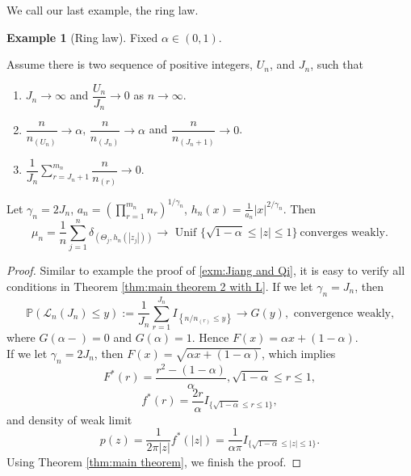 \documentclass[12pt]{article}
\theoremstyle{plain}
\theoremstyle{definition}
\newtheorem{exm}{\textbf{Example}}
\theoremstyle{remark}
\begin{document}
We call our last example, the ring law.
\begin{exm}[Ring law]
    Fixed $\alpha\in (0,1)$.
    
    Assume there is two sequence of positive integers, $U_n$, and $J_n$, such that
    \begin{enumerate}
        \item $J_n\rightarrow \infty$ and $\dfrac{U_n}{J_n}\rightarrow 0$ as $n\rightarrow \infty$.
        \item $\dfrac{n}{n_{(U_n)}}\rightarrow \alpha$, $\dfrac{n}{n_{(J_n)}}\rightarrow \alpha$ and $\dfrac{n}{n_{(J_n+1)}}\rightarrow 0$.
        \item $\dfrac{1}{J_{n}} \sum_{r=J_{n}+1}^{m_n} \dfrac{n}{n_{(r)}} \rightarrow 0$.
    \end{enumerate}
     Let $\gamma_{n}=2J_n$, $a_{n}=\left(\prod_{r=1}^{m_n}n_{r}\right)^{1 / \gamma_{n}}$, $h_{n}(x)=\frac{1}{a_{n}}|x|^{2 / \gamma_{n}}$. Then
    \begin{equation*}
    \mu_{n}=\frac{1}{n} \sum_{j=1}^{n} \delta_{\left(\Theta_{j}, h_{n}\left(\left|z_{j}\right|\right)\right)}\rightarrow \text { Unif }\{\sqrt{1-\alpha} \leq |z| \leq 1\}\ \text{converges weakly}.
    \end{equation*}
\end{exm}
\begin{proof}
    Similar to example the proof of \ref{exm:Jiang and Qi}, it is easy to verify all conditions in Theorem \ref{thm:main theorem 2 with L}. If we let $\gamma_{n}=J_n$, then
    \begin{equation*}
    \mathbb{P}\left(\mathscr{L}_{n}\left(J_{n}\right) \leqslant y\right) :=\frac{1}{J_{n}} \sum_{r=1}^{J_{n}} I_{\left\{n / n_{(r)} \leqslant y\right\}} \rightarrow G(y), \text { convergence weakly,}
    \end{equation*}
    where $G(\alpha-)=0$ and $G(\alpha)=1$. Hence $F(x)=\alpha x+(1-\alpha)$. \\
    If we let $\gamma_{n}=2J_n$, then $F(x)=\sqrt {\alpha x+(1-\alpha)}$, which implies $$F^*(r)=\dfrac{r^2-(1-\alpha)}{\alpha},\sqrt{1-\alpha} \leq r\leq 1,$$ $$f^*(r)=\dfrac{2r}{\alpha}I_{\{\sqrt{1-\alpha} \leq r\leq 1\}},$$
    and density of weak limit $$p(z)=\frac{1}{2 \pi|z|} f^{*}(|z|)=\frac{1}{\alpha\pi}I_{\{ \sqrt{1-\alpha} \leq |z|\leq 1\}}.$$ Using Theorem \ref{thm:main theorem}, we finish the proof.

\end{proof}
\end{document}
